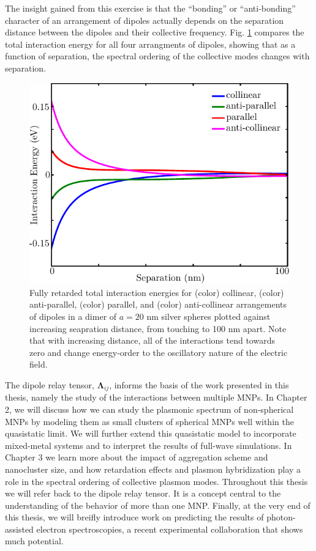 \documentclass [11pt, proquest] {uwthesis}[2016/11/22]
\begin{document}
The insight gained from this exercise is that the ``bonding'' or ``anti-bonding'' character of an arrangement of dipoles actually depends on the separation distance between the dipoles and their collective frequency. Fig. \ref{dimer_ret_tot} compares the total interaction energy for all four arrangments of dipoles, showing that as a function of separation, the spectral ordering of the collective modes changes with separation.

\begin{figure}
\begin{centering}
\includegraphics{dimer_ret_total.pdf}
\caption{Fully retarded total interaction energies for (color) collinear, (color) anti-parallel, (color) parallel, and (color) anti-collinear arrangements of dipoles in a dimer of $a=20$ nm silver spheres plotted against increasing seapration distance, from touching to 100 nm apart. Note that with increasing distance, all of the interactions tend towards zero and change energy-order to the oscillatory nature of the electric field.}
\label{dimer_ret_tot}
\end{centering}
\end{figure}

The dipole relay tensor, $\boldsymbol{\Lambda}_{ij}$, informs the basis of the work presented in this thesis, namely the study of the interactions between multiple MNPs. In Chapter 2, we will discuss how we can study the plasmonic spectrum of non-spherical MNPs by modeling them as small clusters of spherical MNPs well within the quasistatic limit. We will further extend this quasistatic model to incorporate mixed-metal systems and to interpret the results of full-wave simulations. In Chapter 3 we learn more about the impact of aggregation scheme and nanocluster size, and how retardation effects and plasmon hybridization play a role in the spectral ordering of collective plasmon modes. Throughout this thesis we will refer back to the dipole relay tensor. It is a concept central to the understanding of the behavior of more than one MNP. Finally, at the very end of this thesis, we will breifly introduce work on predicting the results of photon-assisted electron spectroscopies, a recent experimental collaboration that shows much potential.
\newpage
\end{document}
